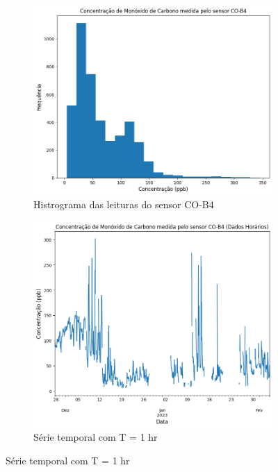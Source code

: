 \begin{figure}[h]
    \centering
    \caption{Histograma e série temporal horária das leituras do sensor CO-B4}
    \begin{subfigure}{0.495\textwidth}
        \includegraphics[width=\textwidth]{chapters/3-RESULTADOS CAMPO/Figuras/preproc-hist-co-b4.png}
        \caption{Histrograma das leituras do sensor CO-B4}
        \label{fig:data-co-preproc-hist}
    \end{subfigure}
    \hfill
    \begin{subfigure}{0.495\textwidth}
        \includegraphics[width=\textwidth]{chapters/3-RESULTADOS CAMPO/Figuras/preproc-1HR-co-b4.png}
        \caption{Série temporal com T = 1 hr}
        \label{fig:data-co-preproc-1HR}
    \end{subfigure}
\end{figure}

